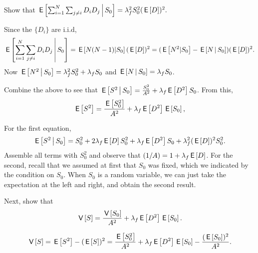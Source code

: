 \begin{exercise}
Show that 
$\,\mathsf{E}\left[\sum_{i=1}^N \sum_{j\neq i} D_i D_j\,\middle|\, S_0\right] = \lambda_f^2 S_0^2 (\,\mathsf{E}\left[D\right])^2.$
\begin{solution}
Since the $\{D_i\}$ are i.i.d, 
  \begin{equation*}
\,\mathsf{E}\left[\sum_{i=1}^N \sum_{j\neq i} D_i D_j\,\middle|\, S_0\right]
= \,\mathsf{E}\left[N(N-1)|S_0\right] (\,\mathsf{E}\left[D\right])^2 
= (\,\mathsf{E}\left[N^2|S_0\right]-\,\mathsf{E}\left[N\,\middle|\, S_0\right]) (\,\mathsf{E}\left[D\right])^2.
  \end{equation*}
Now $\,\mathsf{E}\left[N^2\,\middle|\, S_0\right]=\lambda_f^2 S_0^2 +\lambda_f S_0$ and $\,\mathsf{E}\left[N\,\middle|\, S_0\right] = \lambda_f S_0$.
\end{solution}
\end{exercise}

\begin{exercise}
  Combine the above to see that
    $\,\mathsf{E}\left[S^2\,\middle|\, S_0\right] = \frac{S_0^2}{A^2} + \lambda_f \,\mathsf{E}\left[D^2\right] S_0$. From this, 
  \begin{equation*}
    \,\mathsf{E}\left[S^2\right] = \frac{\,\mathsf{E}\left[S_0^2\right]}{A^2} + \lambda_f \,\mathsf{E}\left[D^2\right] \,\mathsf{E}\left[S_0\right],
  \end{equation*}
  \begin{solution}
For the first equation,
\begin{equation*}
  \,\mathsf{E}\left[S^2\,\middle|\, S_0\right] = S_0^2 + 2\lambda_f \,\mathsf{E}\left[D\right] S_0^2 + \lambda_f \,\mathsf{E}\left[D^2\right] S_0 + \lambda_f^2 (\,\mathsf{E}\left[D\right])^2 S_0^2.
\end{equation*}
Assemble all terms with $S_0^2$ and observe that $(1/A) = 1+\lambda_f \,\mathsf{E}\left[D\right]$. For the second, recall that we assumed at first that $S_0$ was fixed, which we indicated by the condition on $S_0$. When $S_0$ is a random variable, we can just take the expectation at the left and right, and obtain the second result. 
  \end{solution}
\end{exercise}

\begin{exercise}
Next, show that  
  \begin{equation*}
    \,\mathsf{V}\left[S\right] = \frac{\,\mathsf{V}\left[S_0\right]}{A^2} + \lambda_f \,\mathsf{E}\left[D^2\right] \,\mathsf{E}\left[S_0\right].
  \end{equation*}
  \begin{solution}
    \begin{equation*}
    \,\mathsf{V}\left[S\right] = \,\mathsf{E}\left[S^2\right] - (\,\mathsf{E}\left[S\right])^2 = 
\frac{\,\mathsf{E}\left[S_0^2\right]}{A^2} + \lambda_f \,\mathsf{E}\left[D^2\right] \,\mathsf{E}\left[S_0\right] -\frac{(\,\mathsf{E}\left[S_0\right])^2}{A^2}.
    \end{equation*}
  \end{solution}
\end{exercise}

